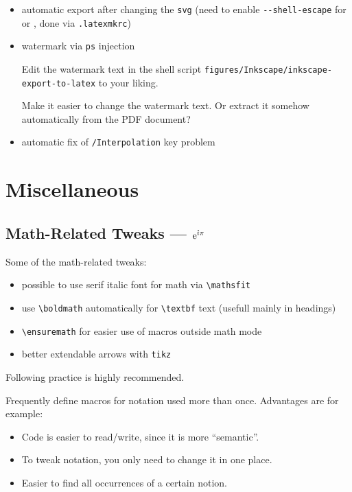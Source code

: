 \begin{itemize}
    \item automatic export after changing the \texttt{svg} (need to enable \verb|--shell-escape| for  or , done via \texttt{.latexmkrc})
    \item watermark via \texttt{ps} injection
          \begin{remark}
              Edit the watermark text in the shell script \verb|figures/Inkscape/inkscape-export-to-latex| to your liking.
          \end{remark}
          \begin{Todo}
              Make it easier to change the watermark text.
              Or extract it somehow automatically from the PDF document?
          \end{Todo}
    \item automatic fix of \texttt{/Interpolation} key problem
\end{itemize}


\section{Miscellaneous}%
\label{sec:Miscellaneous}

\subsection{Math-Related Tweaks --- \texorpdfstring{\(\E^{\I\pi}\)}{exp(iπ)}}%
\label{sub:Math Macros}

Some of the math-related tweaks:
\begin{itemize}
    \item possible to use serif italic font for math via \verb|\mathsfit|
    \item use \verb|\boldmath| automatically for \verb|\textbf| text (usefull mainly in headings)
    \item \verb|\ensuremath| for easier use of macros outside math mode
    \item better extendable arrows with \texttt{tikz}
\end{itemize}

\vspace{1ex}
Following practice is highly recommended.
\begin{tip}
    Frequently define macros for notation used more than once. Advantages are for example:
    \begin{itemize}
        \item Code is easier to read/write, since it is more \enquote{semantic}.
        \item To tweak notation, you only need to change it in one place.
        \item Easier to find all occurrences of a certain notion. \qedhere
    \end{itemize}
\end{tip}

